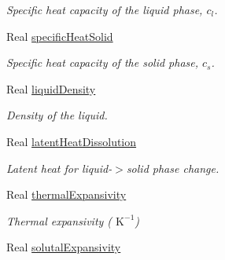 \begin{DoxyCompactItemize}
\begin{DoxyCompactList}\small\item\em Specific heat capacity of the liquid phase, $ c_l $. \end{DoxyCompactList}\item 
\hypertarget{class_mushy_layer_params_ad7f89d49eb18122b9a8a6be3359ae5c1}{Real \hyperlink{class_mushy_layer_params_ad7f89d49eb18122b9a8a6be3359ae5c1}{specific\-Heat\-Solid}}\label{class_mushy_layer_params_ad7f89d49eb18122b9a8a6be3359ae5c1}

\begin{DoxyCompactList}\small\item\em Specific heat capacity of the solid phase, $c_s$. \end{DoxyCompactList}\item 
\hypertarget{class_mushy_layer_params_add77a2b935f21ac4cf3d7fe83afac04c}{Real \hyperlink{class_mushy_layer_params_add77a2b935f21ac4cf3d7fe83afac04c}{liquid\-Density}}\label{class_mushy_layer_params_add77a2b935f21ac4cf3d7fe83afac04c}

\begin{DoxyCompactList}\small\item\em Density of the liquid. \end{DoxyCompactList}\item 
\hypertarget{class_mushy_layer_params_a98ffdd6b098c0950601611df2b6c60a4}{Real \hyperlink{class_mushy_layer_params_a98ffdd6b098c0950601611df2b6c60a4}{latent\-Heat\-Dissolution}}\label{class_mushy_layer_params_a98ffdd6b098c0950601611df2b6c60a4}

\begin{DoxyCompactList}\small\item\em Latent heat for liquid-\/$>$solid phase change. \end{DoxyCompactList}\item 
\hypertarget{class_mushy_layer_params_abac32891e2e9f03ab16ce6502104db9a}{Real \hyperlink{class_mushy_layer_params_abac32891e2e9f03ab16ce6502104db9a}{thermal\-Expansivity}}\label{class_mushy_layer_params_abac32891e2e9f03ab16ce6502104db9a}

\begin{DoxyCompactList}\small\item\em Thermal expansivity ( $\mbox{K}^{-1} $) \end{DoxyCompactList}\item 
\hypertarget{class_mushy_layer_params_a2aa5fcbb49c158c75b8728596ed25b45}{Real \hyperlink{class_mushy_layer_params_a2aa5fcbb49c158c75b8728596ed25b45}{solutal\-Expansivity}}\label{class_mushy_layer_params_a2aa5fcbb49c158c75b8728596ed25b45}


\end{DoxyCompactItemize}
